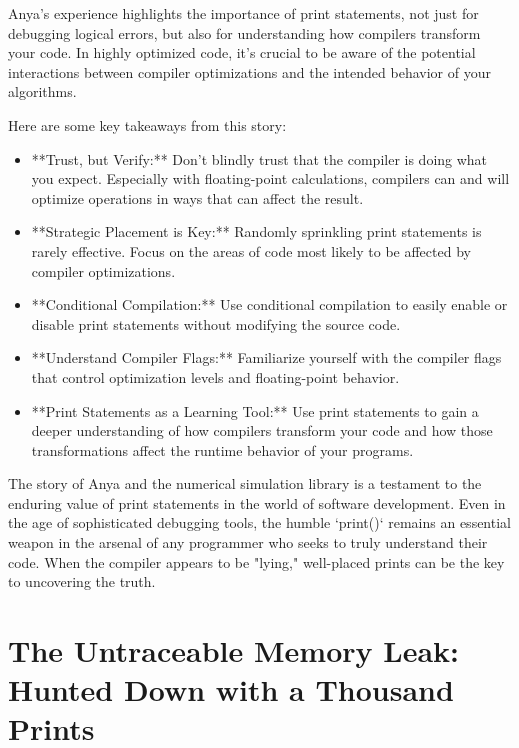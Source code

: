 \documentclass{article}
\begin{document}
{{{{Anya's experience highlights the importance of print statements, not just for debugging logical errors, but also for understanding how compilers transform your code. In highly optimized code, it's crucial to be aware of the potential interactions between compiler optimizations and the intended behavior of your algorithms.

Here are some key takeaways from this story:

\begin{itemize}
    \item **Trust, but Verify:** Don't blindly trust that the compiler is doing what you expect. Especially with floating-point calculations, compilers can and will optimize operations in ways that can affect the result.
    \item **Strategic Placement is Key:** Randomly sprinkling print statements is rarely effective. Focus on the areas of code most likely to be affected by compiler optimizations.
    \item **Conditional Compilation:** Use conditional compilation to easily enable or disable print statements without modifying the source code.
    \item **Understand Compiler Flags:** Familiarize yourself with the compiler flags that control optimization levels and floating-point behavior.
    \item **Print Statements as a Learning Tool:** Use print statements to gain a deeper understanding of how compilers transform your code and how those transformations affect the runtime behavior of your programs.
\end{itemize}

The story of Anya and the numerical simulation library is a testament to the enduring value of print statements in the world of software development. Even in the age of sophisticated debugging tools, the humble `print()` remains an essential weapon in the arsenal of any programmer who seeks to truly understand their code. When the compiler appears to be "lying," well-placed prints can be the key to uncovering the truth.

\newpage

\section*{The Untraceable Memory Leak: Hunted Down with a Thousand Prints} %
\label{chapter-8-6-The_Untraceable_Memory_Leak__Hunted_Down}

}}}}
\end{document}
